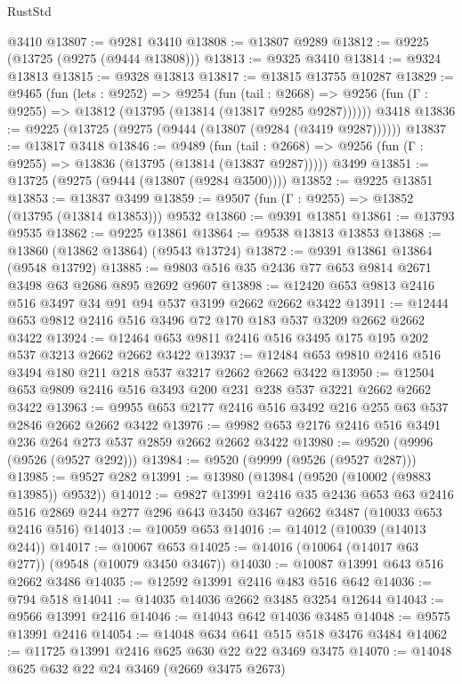 \begin{lexlean}{RustStd}
\begin{coremodule}
    @3410
@13807 := @9281 @3410
@13808 := @13807 @9289
@13812 := @9225 (@13725 (@9275 (@9444 @13808)))
@13813 := @9325 @3410
@13814 := @9324 @13813
@13815 := @9328 @13813
@13817 := @13815 @13755 @10287
@13829 := @9465
    (fun (lets : @9252) =>
    @9254
      (fun (tail : @2668) =>
      @9256 (fun (Γ : @9255) => @13812 (@13795 (@13814 (@13817 @9285 @9287))))))
    @3418
@13836 := @9225 (@13725 (@9275 (@9444 (@13807 (@9284 (@3419 @9287))))))
@13837 := @13817 @3418
@13846 := @9489
    (fun (tail : @2668) => @9256 (fun (Γ : @9255) => @13836 (@13795 (@13814 (@13837 @9287)))))
    @3499
@13851 := @13725 (@9275 (@9444 (@13807 (@9284 @3500))))
@13852 := @9225 @13851
@13853 := @13837 @3499
@13859 := @9507 (fun (Γ : @9255) => @13852 (@13795 (@13814 @13853))) @9532
@13860 := @9391 @13851
@13861 := @13793 @9535
@13862 := @9225 @13861
@13864 := @9538 @13813 @13853
@13868 := @13860 (@13862 @13864) (@9543 @13724)
@13872 := @9391 @13861 @13864 (@9548 @13792)
@13885 := @9803 @516 @35 @2436 @77 @653 @9814 @2671 @3498 @63 @2686 @895 @2692 @9607
@13898 := @12420 @653 @9813 @2416 @516 @3497 @34 @91 @94 @537 @3199 @2662 @2662 @3422
@13911 := @12444 @653 @9812 @2416 @516 @3496 @72 @170 @183 @537 @3209 @2662 @2662 @3422
@13924 := @12464 @653 @9811 @2416 @516 @3495 @175 @195 @202 @537 @3213 @2662 @2662 @3422
@13937 := @12484 @653 @9810 @2416 @516 @3494 @180 @211 @218 @537 @3217 @2662 @2662 @3422
@13950 := @12504 @653 @9809 @2416 @516 @3493 @200 @231 @238 @537 @3221 @2662 @2662 @3422
@13963 := @9955 @653 @2177 @2416 @516 @3492 @216 @255 @63 @537 @2846 @2662 @2662 @3422
@13976 := @9982 @653 @2176 @2416 @516 @3491 @236 @264 @273 @537 @2859 @2662 @2662 @3422
@13980 := @9520 (@9996 (@9526 (@9527 @292)))
@13984 := @9520 (@9999 (@9526 (@9527 @287)))
@13985 := @9527 @282
@13991 := @13980 (@13984 (@9520 (@10002 (@9883 @13985)) @9532))
@14012 := @9827
    @13991
    @2416
    @35
    @2436
    @653
    @63
    @2416
    @516
    @2869
    @244
    @277
    @296
    @643
    @3450
    @3467
    @2662
    @3487
    (@10033 @653 @2416 @516)
@14013 := @10059 @653
@14016 := @14012 (@10039 (@14013 @244))
@14017 := @10067 @653
@14025 := @14016 (@10064 (@14017 @63 @277)) (@9548 (@10079 @3450 @3467))
@14030 := @10087 @13991 @643 @516 @2662 @3486
@14035 := @12592 @13991 @2416 @483 @516 @642
@14036 := @794 @518
@14041 := @14035 @14036 @2662 @3485 @3254 @12644
@14043 := @9566 @13991 @2416
@14046 := @14043 @642 @14036 @3485
@14048 := @9575 @13991 @2416
@14054 := @14048 @634 @641 @515 @518 @3476 @3484
@14062 := @11725 @13991 @2416 @625 @630 @22 @22 @3469 @3475
@14070 := @14048 @625 @632 @22 @24 @3469 (@2669 @3475 @2673)

\end{coremodule}
\end{lexlean}
